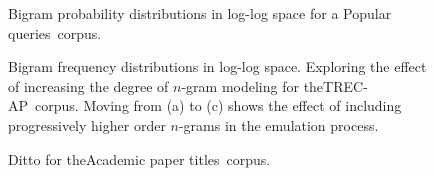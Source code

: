 \documentclass[11pt]{report}
\newcommand{\TRECAP}{TREC-AP}
\newcommand{\TopQ}{Popular queries}
\newcommand{\AcademicID}{Academic paper titles}
\newcommand{\PP}{Imagefiles}
\begin{document}
\begin{figure}[p]
\centering

\caption{Bigram probability distributions in log-log space for a
  \TopQ~corpus. 
\label{fitTM}}
\end{figure}






\begin{figure}[p]
\centering

\caption{Bigram frequency distributions in log-log space.  Exploring
  the effect of increasing the degree of $n$-gram modeling for
  the\TRECAP~corpus. Moving from (a) to (c) shows the effect of including
  progressively higher order $n$-grams in the emulation process.
\label{fitAP2}}
\end{figure}


\begin{figure}[p]
\centering

\caption{Ditto for
  the\AcademicID~corpus. 
\label{fitAc2}}
\end{figure}
\end{document}
